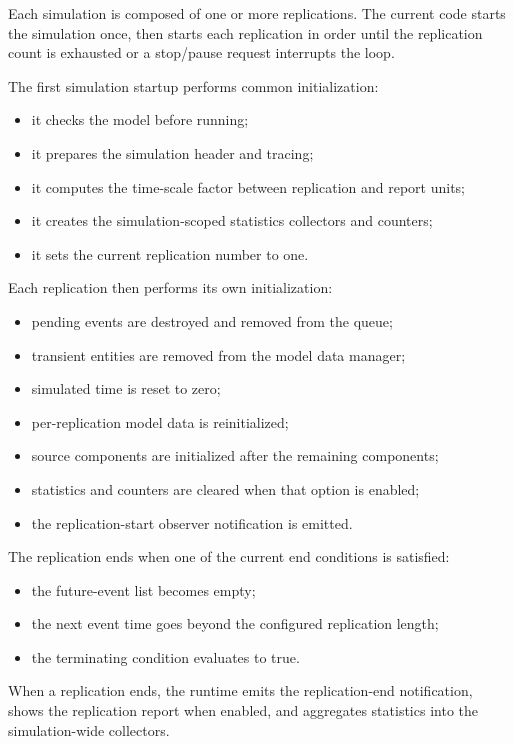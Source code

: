 Each simulation is composed of one or more replications. The current code
starts the simulation once, then starts each replication in order until the
replication count is exhausted or a stop/pause request interrupts the loop.

The first simulation startup performs common initialization:
\begin{itemize}
\item it checks the model before running;
\item it prepares the simulation header and tracing;
\item it computes the time-scale factor between replication and report units;
\item it creates the simulation-scoped statistics collectors and counters;
\item it sets the current replication number to one.
\end{itemize}

Each replication then performs its own initialization:
\begin{itemize}
\item pending events are destroyed and removed from the queue;
\item transient entities are removed from the model data manager;
\item simulated time is reset to zero;
\item per-replication model data is reinitialized;
\item source components are initialized after the remaining components;
\item statistics and counters are cleared when that option is enabled;
\item the replication-start observer notification is emitted.
\end{itemize}

The replication ends when one of the current end conditions is satisfied:
\begin{itemize}
\item the future-event list becomes empty;
\item the next event time goes beyond the configured replication length;
\item the terminating condition evaluates to true.
\end{itemize}

When a replication ends, the runtime emits the replication-end notification,
shows the replication report when enabled, and aggregates statistics into the
simulation-wide collectors.


